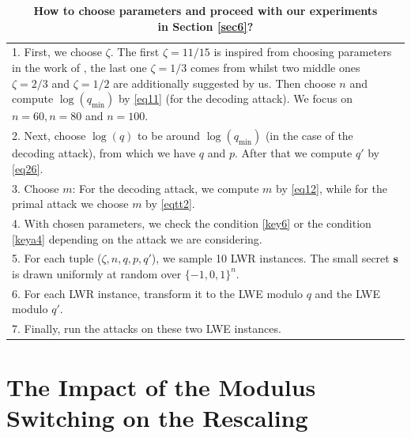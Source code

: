 \documentclass{cta-author}
\begin{document}
\begin{table}[pt]
	\centering
	\small\addtolength{\tabcolsep}{1.7pt}
	\caption{\textbf{How to choose parameters and proceed with our experiments\\ in Section \ref{sec6}?} } 
	
	\begin{tabular}{p{8cm}}
		
		\hline
		\hline
		
		1. First, we choose $\zeta$. The first $\zeta=11/15$ is inspired from choosing parameters in the work of \cite{BBGM+19}, the last one $\zeta=1/3$ comes from  \cite{DTV15} whilst two middle ones $\zeta=2/3$ and $\zeta=1/2$ are additionally suggested by us.  Then choose $n$ and compute $\log (q_{\text{min}})$ by \eqref{eq11} (for the decoding attack). We focus on $n=60, n=80$ and $n=100$.\\
		2. Next, choose $\log (q)$ to be around $\log (q_{\text{min}})$ (in the case of the decoding attack), from which we have $q$ and $p$.
		After that we compute $q'$ by \eqref{eq26}.\\
		3. Choose $m$: For the decoding attack, we compute $m$ by \eqref{eq12}, while for the primal attack we choose $m$ by \eqref{eqtt2}.  \\
		4. With chosen parameters, we check the condition \eqref{key6} or the condition \eqref{keya4} depending on the attack we are considering. \\
		5. For each tuple ($\zeta, n, q, p, q'$), we sample 10 LWR instances. The small secret $\mathbf{s}$ is drawn uniformly at random over $\{-1,0,1\}^n$.\\
		6. For each LWR instance, transform it to the LWE modulo $q$ and the LWE modulo $q'$. \\
		7. Finally, run the attacks on these two LWE instances. \\
		\hline
		\hline
		
	\end{tabular}
	\label{table:1}
\end{table}


\section{The Impact of the Modulus Switching on the Rescaling} \label{impact}
\end{document}
